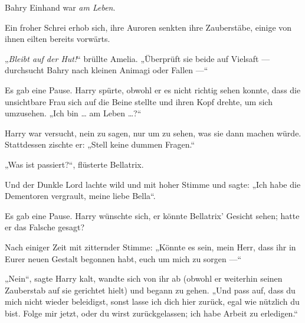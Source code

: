 Bahry Einhand war \emph{am Leben}.

Ein froher Schrei erhob sich, ihre Auroren senkten ihre Zauberstäbe, einige von ihnen eilten bereits vorwärts.

„\emph{Bleibt auf der Hut!}“ brüllte Amelia. „Überprüft sie beide auf Vielsaft — durchsucht Bahry nach kleinen Animagi oder Fallen —“

\later

 

Es gab eine Pause. Harry spürte, obwohl er es nicht richtig sehen konnte, dass die unsichtbare Frau sich auf die Beine stellte und ihren Kopf drehte, um sich umzusehen.
„Ich bin … am Leben …?“

Harry war versucht, nein zu sagen, nur um zu sehen, was sie dann machen würde. Stattdessen zischte er:
„Stell keine dummen Fragen.“

„Was ist passiert?“, flüsterte Bellatrix.

Und der Dunkle Lord lachte wild und mit hoher Stimme und sagte:
„Ich habe die Dementoren vergrault, meine liebe Bella“.

Es gab eine Pause. Harry wünschte sich, er könnte Bellatrix’ Gesicht sehen; hatte er das Falsche gesagt?

Nach einiger Zeit mit zitternder Stimme:
„Könnte es sein, mein Herr, dass ihr in Eurer neuen Gestalt begonnen habt, euch um mich zu sorgen —“

„Nein“, sagte Harry kalt, wandte sich von ihr ab (obwohl er weiterhin seinen Zauberstab auf sie gerichtet hielt) und begann zu gehen.
„Und pass auf, dass du mich nicht wieder beleidigst, sonst lasse ich dich hier zurück, egal wie nützlich du bist. Folge mir jetzt, oder du wirst zurückgelassen; ich habe Arbeit zu erledigen.“

